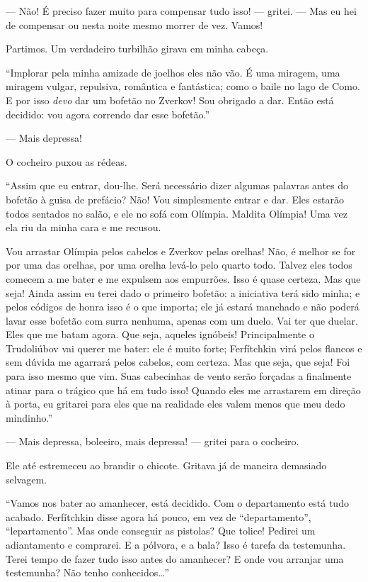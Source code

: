 --- Não! É preciso fazer muito para compensar tudo isso! --- gritei. --- Mas
eu hei de compensar ou nesta noite mesmo morrer de vez. Vamos!

Partimos. Um verdadeiro turbilhão girava em minha cabeça.

“Implorar pela minha amizade de joelhos eles não vão. É uma miragem, uma
miragem vulgar, repulsiva, romântica e fantástica; como o baile no lago
de Como. E por isso \textit{devo} dar um bofetão no Zverkov! Sou
obrigado a dar. Então está decidido: vou agora correndo dar esse
bofetão.”

--- Mais depressa!

O cocheiro puxou as rédeas.

“Assim que eu entrar, dou-lhe. Será necessário dizer algumas palavras
antes do bofetão à guisa de prefácio? Não! Vou simplesmente entrar e dar.
Eles estarão todos sentados no salão, e ele no sofá com Olímpia.
Maldita Olímpia! Uma vez ela riu da minha cara e me recusou.

Vou arrastar Olímpia pelos cabelos e Zverkov pelas orelhas! Não, é
melhor se for por uma das orelhas, por uma orelha levá-lo pelo quarto
todo. Talvez eles todos comecem a me bater e me expulsem aos empurrões.
Isso é quase certeza. Mas que seja! Ainda assim eu terei dado o
primeiro bofetão: a iniciativa terá sido minha; e pelos códigos de
honra isso é o que importa; ele já estará manchado e não poderá lavar
esse bofetão com surra nenhuma, apenas com um duelo. Vai ter que
duelar. Eles que me batam agora. Que seja, aqueles ignóbeis!
Principalmente o Trudoliúbov vai querer me bater: ele é muito forte;
Ferfítchkin virá pelos flancos e sem dúvida me agarrará pelos cabelos,
com certeza. Mas que seja, que seja! Foi para isso mesmo que vim. Suas
cabecinhas de vento serão forçadas a finalmente atinar para o trágico
que há em tudo isso! Quando eles me arrastarem em direção à porta, eu
gritarei para eles que na realidade eles valem menos que meu dedo
mindinho.”

--- Mais depressa, boleeiro, mais depressa! --- gritei para o cocheiro.

Ele até estremeceu ao brandir o chicote. Gritava já de maneira demasiado
selvagem.

“Vamos nos bater ao amanhecer, está decidido. Com o departamento está
tudo acabado. Ferfítchkin disse agora há pouco, em vez de
“departamento”, “lepartamento”. Mas onde conseguir as pistolas? Que
tolice! Pedirei um adiantamento e comprarei. E a pólvora, e a bala?
Isso é tarefa da testemunha. Terei tempo de fazer tudo isso antes do
amanhecer? E onde vou arranjar uma testemunha? Não tenho conhecidos\ldots{}”

